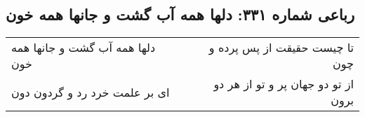 \begin{center}
\section*{رباعی شماره ۳۳۱: دلها همه آب گشت و جانها همه خون}
\label{sec:sh331}
\begin{longtable}{l p{0.5cm} r}
دلها همه آب گشت و جانها همه خون
&&
تا چیست حقیقت از پس پرده و چون
\\
ای بر علمت خرد رد و گردون دون
&&
از تو دو جهان پر و تو از هر دو برون
\\
\end{longtable}
\end{center}
